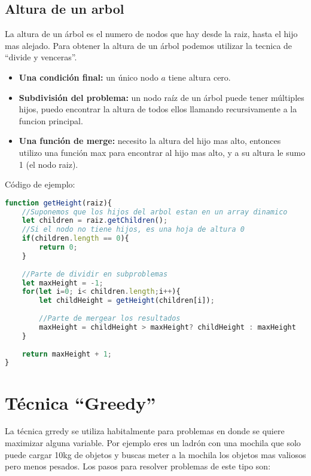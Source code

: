 \subsection{Altura de un arbol}

La altura de un árbol es el numero de nodos que hay desde la raiz, hasta el hijo mas alejado. Para obtener la altura de un árbol podemos utilizar la tecnica de ``divide y venceras''. 

\begin{itemize}
    \item \textbf{Una condición final:} un único nodo $a$ tiene altura cero.
    \item \textbf{Subdivisión del problema:} un nodo raíz de un árbol puede tener múltiples hijos, puedo encontrar la altura de todos ellos llamando recursivamente a la funcion principal.
    \item \textbf{Una función de merge:} necesito la altura del hijo mas alto, entonces utilizo una función max para encontrar al hijo mas alto, y a su altura le sumo 1 (el nodo raiz). 
\end{itemize}


Código de ejemplo:

\begin{lstlisting}[language=JavaScript, caption=Altura de un arbol]
function getHeight(raiz){
    //Suponemos que los hijos del arbol estan en un array dinamico
    let children = raiz.getChildren();
    //Si el nodo no tiene hijos, es una hoja de altura 0
    if(children.length == 0){
        return 0;
    }
    
    //Parte de dividir en subproblemas
    let maxHeight = -1;
    for(let i=0; i< children.length;i++){
        let childHeight = getHeight(children[i]);
        
        //Parte de mergear los resultados
        maxHeight = childHeight > maxHeight? childHeight : maxHeight
    }
    
    return maxHeight + 1;
}
\end{lstlisting}

\section{Técnica ``Greedy''}

La técnica grredy se utiliza habitalmente para problemas en donde se quiere maximizar alguna variable. Por ejemplo eres un ladrón con una mochila que solo puede cargar 10kg de objetos y buscas meter a la mochila los objetos mas valiosos pero menos pesados. Los pasos para resolver problemas de este tipo son:

